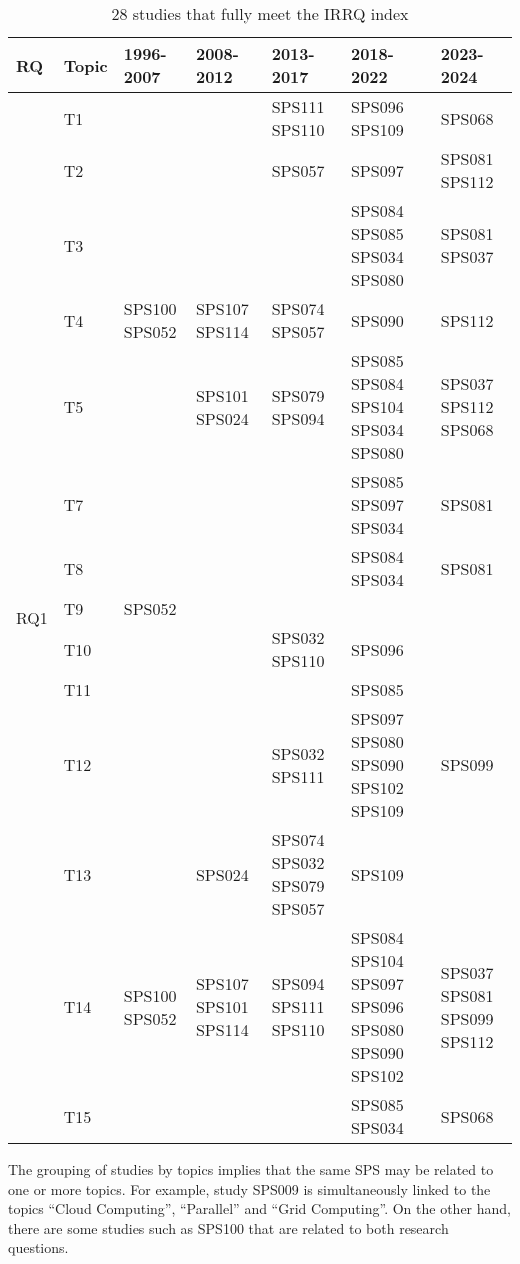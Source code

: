 \begin{table*}[htbp]
    \renewcommand{\arraystretch}{1.3}
    \setlength{\tabcolsep}{3pt}
    \centering
    \caption{28 studies that fully meet the IRRQ index}
    \begin{tabular}{p{0.8cm}p{0.9cm}p{2.7cm}p{2.7cm}p{2.7cm}p{2.7cm}p{1.7cm}}
        \hline
        \textbf{RQ} & \textbf{Topic} & \textbf{1996-2007} & \textbf{2008-2012} & \textbf{2013-2017} & \textbf{2018-2022} & \textbf{2023-2024} \\
        \hline
        \multirow{17}{*}{RQ1} & T1 &  &  & SPS111 SPS110 & SPS096 SPS109 & SPS068 \\
        & T2 &  &  & SPS057 & SPS097 & SPS081 SPS112 \\
        & T3 &  &  &  & SPS084 SPS085 SPS034 SPS080 & SPS081 SPS037 \\
        & T4 & SPS100 SPS052 & SPS107 SPS114 & SPS074 SPS057 & SPS090 & SPS112 \\
        & T5 &  & SPS101 SPS024 & SPS079 SPS094 & SPS085 SPS084 SPS104 SPS034 SPS080 & SPS037 SPS112 SPS068 \\
        & T7 &  &  &  & SPS085 SPS097 SPS034 & SPS081 \\
        & T8 &  &  &  & SPS084 SPS034 & SPS081 \\
        & T9 & SPS052 &  &  &  &  \\
        & T10 &  &  & SPS032 SPS110 & SPS096 &  \\
        & T11 &  &  &  & SPS085 &  \\
        & T12 &  &  & SPS032 SPS111 & SPS097 SPS080 SPS090 SPS102 SPS109 & SPS099 \\
        \hline
        \multirow{7}{*}{RQ2} & T13 &  & SPS024 & SPS074 SPS032 SPS079 SPS057 & SPS109 &  \\
        & T14 & SPS100 SPS052 & SPS107 SPS101 SPS114 & SPS094 SPS111 SPS110 & SPS084 SPS104 SPS097 SPS096 SPS080 SPS090 SPS102 & SPS037 SPS081 SPS099 SPS112 \\
        & T15 &  &  &  & SPS085 SPS034 & SPS068 \\
        \hline
    \end{tabular}
    \label{table:highest_IRRQ}
\end{table*}

The grouping of studies by topics implies that the same SPS may be related to one or more topics. For example, study SPS009 is simultaneously linked to the topics ``Cloud Computing'', ``Parallel'' and ``Grid Computing''. On the other hand, there are some studies such as SPS100 that are related to both research questions.

